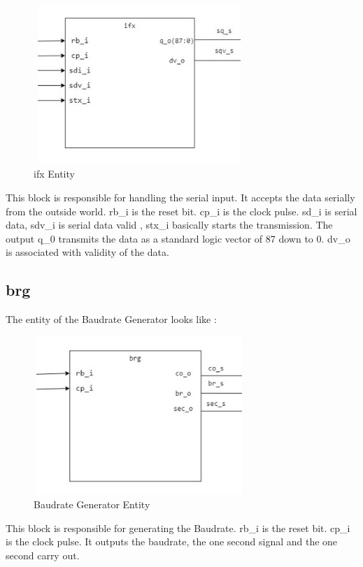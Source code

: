 \documentclass[12pt,a4paper]{article}
\begin{document}
\begin{figure}[H]
\centering
\includegraphics[width=8cm,height=6cm]{ifx_ss.jpg}
\caption{ifx Entity}
\label{ifx Entity}
\end{figure}

This block is responsible for handling the serial input. It accepts the data serially from the outside world. rb\_i is the reset bit. cp\_i is the clock pulse. sd\_i is serial data, sdv\_i is serial data valid , stx\_i basically starts the transmission. The output q\_0 transmits the data as a standard logic vector of 87 down to 0. dv\_o is associated with validity of the data. 

\subsection{brg}
The entity of the Baudrate Generator looks like :\\

\begin{figure}[H]
\centering
\includegraphics[width=8cm,height=6cm]{brg_ss.jpg}
\caption{Baudrate Generator Entity}
\label{Baudrate Generator Entity}
\end{figure}

This block is responsible for generating the Baudrate. rb\_i is the reset bit. cp\_i is the clock pulse. It outputs the baudrate, the one second signal and the one second carry out. 
\end{document}
